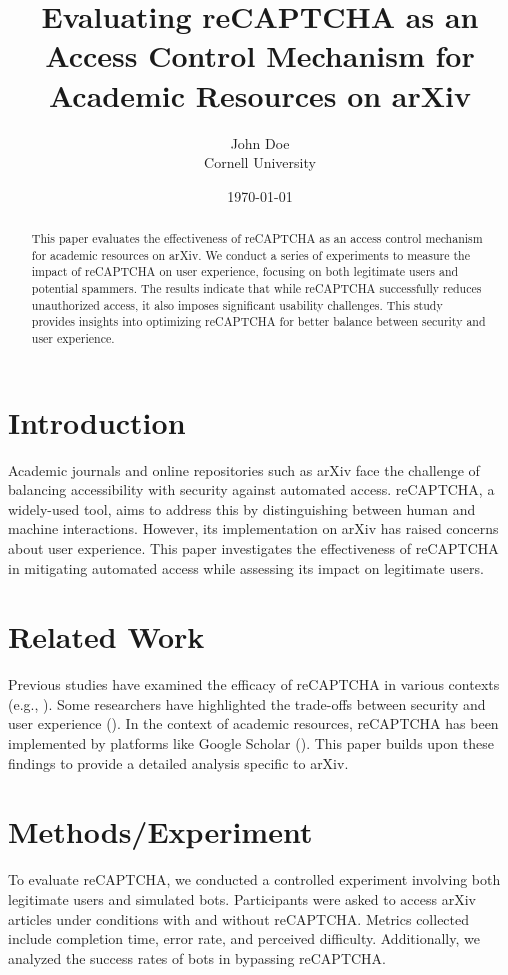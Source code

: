 \documentclass{article}
\title{Evaluating reCAPTCHA as an Access Control Mechanism for Academic Resources on arXiv}
\author{John Doe\\Cornell University}
\date{\today}
\begin{document}
\maketitle

\begin{abstract}
This paper evaluates the effectiveness of reCAPTCHA as an access control mechanism for academic resources on arXiv. We conduct a series of experiments to measure the impact of reCAPTCHA on user experience, focusing on both legitimate users and potential spammers. The results indicate that while reCAPTCHA successfully reduces unauthorized access, it also imposes significant usability challenges. This study provides insights into optimizing reCAPTCHA for better balance between security and user experience.
\end{abstract}

\section{Introduction}
Academic journals and online repositories such as arXiv face the challenge of balancing accessibility with security against automated access. reCAPTCHA, a widely-used tool, aims to address this by distinguishing between human and machine interactions. However, its implementation on arXiv has raised concerns about user experience. This paper investigates the effectiveness of reCAPTCHA in mitigating automated access while assessing its impact on legitimate users.

\section{Related Work}
Previous studies have examined the efficacy of reCAPTCHA in various contexts (e.g., \cite{reCaptchaStudy}). Some researchers have highlighted the trade-offs between security and user experience (\cite{securityVsExperience}). In the context of academic resources, reCAPTCHA has been implemented by platforms like Google Scholar (\cite{googleScholar}). This paper builds upon these findings to provide a detailed analysis specific to arXiv.

\section{Methods/Experiment}
To evaluate reCAPTCHA, we conducted a controlled experiment involving both legitimate users and simulated bots. Participants were asked to access arXiv articles under conditions with and without reCAPTCHA. Metrics collected include completion time, error rate, and perceived difficulty. Additionally, we analyzed the success rates of bots in bypassing reCAPTCHA.
\end{document}
